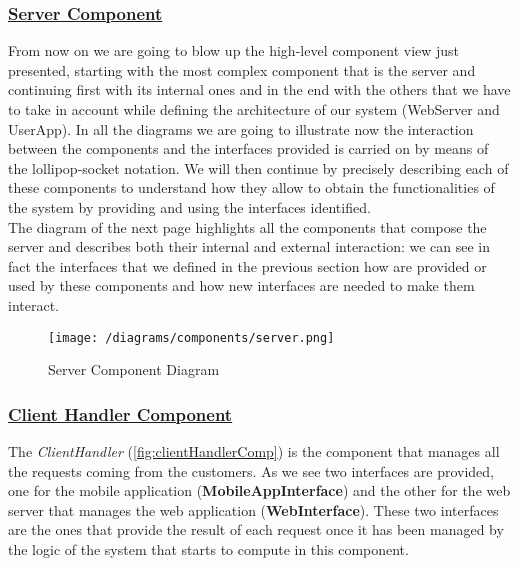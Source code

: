 		\subsubsection[Server Component]{\hyperlink{toc}{Server Component}}
			\label{sec:serverComponent}
			
			From now on we are going to blow up the high-level component view just presented, starting with the most complex component that is the server and continuing first with its internal ones and in the end with the others that we have to take in account while defining the architecture of our system (WebServer and UserApp). In all the diagrams we are going to illustrate now the interaction between the components and the interfaces provided is carried on by means of the lollipop-socket notation. We will then continue by precisely describing each of these components to understand how they allow to obtain the functionalities of the system by providing and using the interfaces identified.\\
			
			The diagram of the next page highlights all the components that compose the server and describes both their internal and external interaction: we can see in fact the interfaces that we defined in the previous section how are provided or used by these components and how new interfaces are needed to make them interact.
			
			\begin{figure}[h!]
				\centering
				\texttt{[image: /diagrams/components/server.png]}
				\caption{\label{fig:serverComp} Server Component Diagram}
			\end{figure}
		
			\FloatBarrier 
		
		\subsubsection[Client Handler Component]{\hyperlink{toc}{Client Handler Component}}
			\label{sec:clientHandlerComponent}
			
			The \emph{ClientHandler} (\autoref{fig:clientHandlerComp}) is the component that manages all the requests coming from the customers. As we see two interfaces are provided, one for the mobile application (\textbf{MobileAppInterface}) and the other for the web server that manages the web application (\textbf{WebInterface}). These two interfaces are the ones that provide the result of each request once it has been managed by the logic of the system that starts to compute in this component.
			
